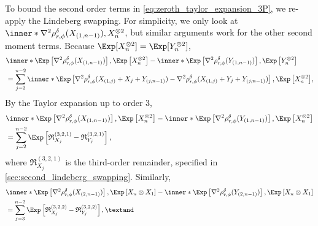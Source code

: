 \documentclass[aos]{imsart}
\begin{document}
\begin{appendix}
\medskip
{}
To bound the second order terms in \cref{eq:zeroth_taylor_expansion_3P}, we re-apply the Lindeberg swapping. For simplicity, we only look at $\inner*{\nabla^2 \rho_{r,\phi}^\delta(X_{(1,n-1)}), X_n^{\otimes 2}}$, but similar arguments work for the other second moment terms. Because $\Exp[X_n^{\otimes 2}] = \Exp[Y_n^{\otimes 2}]$,
\begin{equation*}
\begin{aligned}
    & \inner*{ 
        \Exp\left[ \nabla^2 \rho_{r,\phi}^\delta(X_{(1,n-1)}) \right], 
        \Exp\left[ X_n^{\otimes 2} \right]
    }
    - \inner*{ 
        \Exp\left[ \nabla^2 \rho_{r,\phi}^\delta(Y_{(1,n-1)}) \right], 
        \Exp\left[ Y_n^{\otimes 2} \right]
    } \\
    & = \sum_{j=2}^{n-2} \inner*{ 
        \Exp\left[ 
            \nabla^2 \rho_{r,\phi}^\delta(X_{(1,j)} + X_j + Y_{(j,n-1)}) 
            -\nabla^2 \rho_{r,\phi}^\delta(X_{(1,j)} + Y_j + Y_{(j,n-1)})
        \right], 
        \Exp\left[ X_n^{\otimes 2} \right]
    },
\end{aligned}
\end{equation*}
By the Taylor expansion up to order $3$,
\begin{equation*}
\begin{aligned}
    & \inner*{ 
        \Exp\left[ \nabla^2 \rho_{r,\phi}^\delta(X_{(1,n-1)}) \right], 
        \Exp\left[ X_n^{\otimes 2} \right]}
    - \inner*{ 
        \Exp\left[ \nabla^2 \rho_{r,\phi}^\delta(Y_{(1,n-1)}) \right], 
        \Exp\left[ X_n^{\otimes 2} \right]} \\
    & = \sum_{j=2}^{n-2} \Exp\left[ \mathfrak{R}_{X_j}^{(3,2,1)} - \mathfrak{R}_{Y_j}^{(3,2,1)} \right],
\end{aligned}
\end{equation*}
where $\mathfrak{R}_{X_j}^{(3,2,1)}$ is the third-order remainder, specified in \cref{sec:second_lindeberg_swapping}. Similarly, 
\begin{equation*}
\begin{aligned}
    & \inner*{ 
        \Exp\left[ \nabla^2 \rho_{r,\phi}^\delta(X_{(2,n-1)}) \right], 
        \Exp\left[ X_n \otimes X_1 \right]}
    - \inner*{ 
        \Exp\left[ \nabla^2 \rho_{r,\phi}^\delta(Y_{(2,n-1)}) \right], 
        \Exp\left[ X_n \otimes X_1 \right]} \\
    & = \sum_{j=3}^{n-2} \Exp\left[ \mathfrak{R}_{X_j}^{(3,2,2)} - \mathfrak{R}_{Y_j}^{(3,2,2)} \right], \textand
\end{aligned}

\end{equation*}
\end{appendix}
\end{document}
